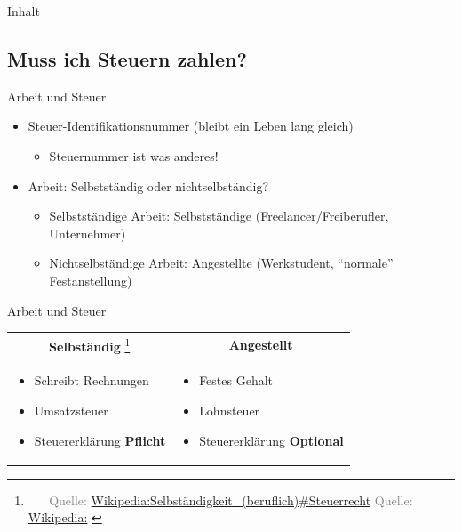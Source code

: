 \documentclass{beamer}
\let\oldfootnote\footnote
\renewcommand{\footnote}[1]
{%
	\oldfootnote
	{
		\tiny
		\textcolor{gray}{\ #1}
	}%
}
\newcommand{\citewiki}[2][]
{%
	\footnote
	{
		\ifthenelse{\isempty{#1}}
		{
			Quelle: \href{https://de.wikipedia.org/wiki/#2}{Wikipedia:#2}
		}
		{
			Quelle: \href{https://de.wikipedia.org/wiki/#2}{Wikipedia:#1}
		}
	}
}
\begin{document}
		\begin{frame}[t]{Inhalt}
		\end{frame}
	
		\subsection{Muss ich Steuern zahlen?}
		
			\begin{frame}{Arbeit und Steuer}
				\begin{itemize}
					\item Steuer-Identifikationsnummer (bleibt ein Leben lang gleich)
					\begin{itemize}
						\item Steuernummer ist was anderes!
					\end{itemize}
					\item Arbeit: Selbstständig oder nichtselbständig?
					\begin{itemize}
						\item Selbstständige Arbeit: Selbstständige (Freelancer/Freiberufler, Unternehmer)
						\item Nichtselbständige Arbeit: Angestellte (Werkstudent, "`normale"' Festanstellung)
					\end{itemize}
				\end{itemize}
			\end{frame}
		
			\begin{frame}{Arbeit und Steuer}
				\begin{tabularx}{\linewidth}{X|X}
					\multicolumn{1}{c|}{\textbf{Selbständig}\citewiki{Selbständigkeit\_(beruflich)\#Steuerrecht}} &
					\multicolumn{1}{c}{\textbf{Angestellt}} \\[0.25cm]
					\begin{itemize}
						\item Schreibt Rechnungen
						\item Umsatzsteuer
						\item Steuererklärung \textbf{Pflicht}
					\end{itemize} &
					\begin{itemize}
						\item Festes Gehalt
						\item Lohnsteuer
						\item Steuererklärung \textbf{Optional}
					\end{itemize}
				\end{tabularx}
			\end{frame}
		
\end{document}
